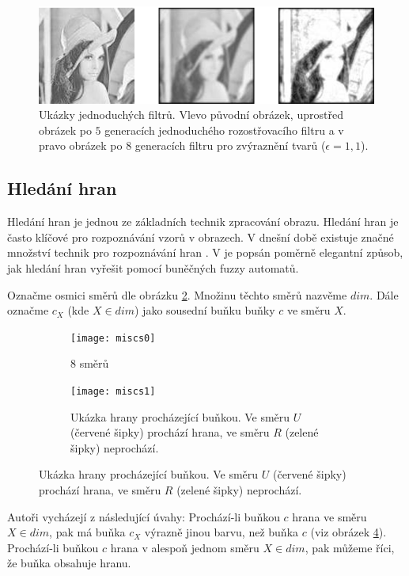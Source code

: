 \documentclass[a4paper,10pt]{article}
\begin{document}
\begin{figure}[]
 \includegraphics[width=\textwidth]{filters}
 
 \caption{Ukázky jednoduchých filtrů. Vlevo původní obrázek, uprostřed obrázek po $5$ generacích jednoduchého rozostřovacího filtru a v pravo obrázek po $8$ generacích filtru pro zvýraznění tvarů ($\epsilon = 1,1$).} \label{img:Filters}
\end{figure}


\subsection{Hledání hran}
Hledání hran je jednou ze základních technik zpracování obrazu. Hledání hran je často klíčové pro rozpoznávání vzorů v obrazech. V dnešní době existuje značné množství technik pro rozpoznávání hran \cite{MaiAgg-StuComVarImDetEdTec}. V \cite{MarMeySol-HybMetGasDifModFuzCelAutImSha} je popsán poměrně elegantní způsob, jak hledání hran vyřešit pomocí buněčných fuzzy automatů.

Označme osmici směrů dle obrázku \ref{img:Directions:8Directions}. Množinu těchto směrů nazvěme $dim$. Dále označme $c_X$ (kde $X \in dim$) jako sousední buňku buňky $c$ ve směru $X$.

\begin{figure}
   \begin{subfigure}[t]{0.4\textwidth}
      \texttt{[image: miscs0]}
      \caption{8 směrů}  \label{img:Directions:8Directions}
    \end{subfigure}%
%
    \begin{subfigure}[t]{0.4\textwidth}
      \texttt{[image: miscs1]}
      \caption{Ukázka hrany procházející buňkou. Ve směru $U$ (červené šipky) prochází hrana, ve směru $R$ (zelené šipky) neprochází.}  \label{img:Directions:Edges}
    \end{subfigure}
\end{figure}

Autoři vycházejí z následující úvahy: Prochází-li buňkou $c$ hrana ve směru $X \in dim$, pak má buňka $c_X$ výrazně jinou barvu, než buňka $c$ (viz obrázek \ref{img:Directions:Edges}). Prochází-li buňkou $c$ hrana v alespoň jednom směru $X \in dim$, pak můžeme říci, že buňka obsahuje hranu.
\end{document}
